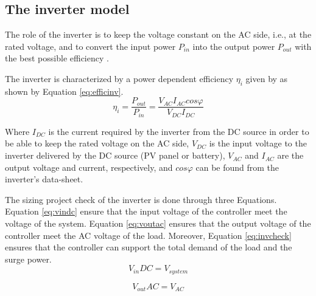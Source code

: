 \documentclass[journal]{IEEEtran}
\begin{document}
\subsection{The inverter model}
The role of the inverter is to keep the voltage constant on the AC side, i.e., at the rated voltage, %
and to convert the input power $ P_{in} $ into the output power $ P_{out} $ with the best possible efficiency \cite{Hansen}.

The inverter is characterized by a power dependent efficiency $ \eta_{i} $ given by \cite{Hansen} as shown by Equation \ref{eq:efficinv}.
\begin{equation}
\label{eq:efficinv}
\eta_{i} = \dfrac{P_{out}}{P_{in}} = \dfrac{V_{AC} I_{AC} cos\varphi}{V_{DC}I_{DC}}
\end{equation}

Where $ I_{DC} $ is the current required by the inverter from the DC source in order to be able to keep the rated voltage on the AC side, $ V_{DC} $ is the input voltage to the inverter delivered by the DC source (PV panel or battery),  $ V_{AC}  $ and $ I_{AC} $ are the output voltage and current, respectively, and $ cos \varphi $ can be found from the inverter's data-sheet.

%
The sizing project check of the inverter is done through three Equations. Equation \ref{eq:vindc} ensure that the input voltage of the controller meet the voltage of the system. Equation \ref{eq:voutac} ensures that the output voltage of the controller meet the AC voltage of the load. Moreover, Equation \ref{eq:invcheck} ensures that the controller can support the total demand of the load and the surge power.
\begin{equation}
\label{eq:vindc} 
V_{in}DC = V_{system}
\end{equation}

\begin{equation}
\label{eq:voutac} 
V_{out}AC = V_{AC}
\end{equation}
\end{document}
